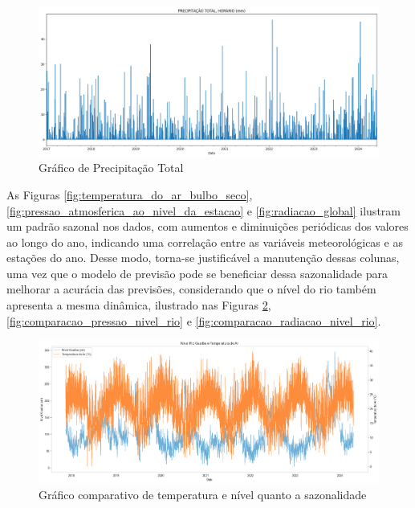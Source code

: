\begin{figure}[H]
	\caption{\label{fig:precipitacao_total}Gráfico de Precipitação Total}
	\begin{center}
		\includegraphics[scale=0.35]{figuras/precipitacao_total_horario.png}
	\end{center}
\end{figure}

As Figuras \ref{fig:temperatura_do_ar_bulbo_seco}, \ref{fig:pressao_atmosferica_ao_nivel_da_estacao} e \ref{fig:radiacao_global} ilustram um padrão sazonal nos dados, com aumentos e diminuições periódicas dos valores ao longo do ano, indicando uma correlação entre as variáveis meteorológicas e as estações do ano. Desse modo, torna-se justificável a manutenção dessas colunas, uma vez que o modelo de previsão pode se beneficiar dessa sazonalidade para melhorar a acurácia das previsões, considerando que o nível do rio também apresenta a mesma dinâmica, ilustrado nas Figuras \ref{fig:comparacao_temp_nivel_rio}, \ref{fig:comparacao_pressao_nivel_rio} e \ref{fig:comparacao_radiacao_nivel_rio}.

\begin{figure}[H]
	\caption{\label{fig:comparacao_temp_nivel_rio}Gráfico comparativo de temperatura e nível quanto a sazonalidade}
	\begin{center}
		\includegraphics[scale=0.35]{figuras/comparacao_temp_nivel_rio.png}
	\end{center}
\end{figure}

